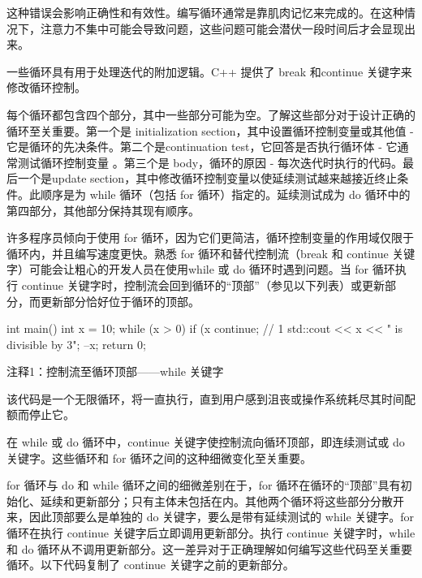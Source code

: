 这种错误会影响正确性和有效性。编写循环通常是靠肌肉记忆来完成的。在这种情况下，注意力不集中可能会导致问题，这些问题可能会潜伏一段时间后才会显现出来。


一些循环具有用于处理迭代的附加逻辑。C++ 提供了 break 和continue 关键字来修改循环控制。

每个循环都包含四个部分，其中一些部分可能为空。了解这些部分对于设计正确的循环至关重要。第一个是 initialization section，其中设置循环控制变量或其他值 - 它是循环的先决条件。第二个是continuation test，它回答是否执行循环体 - 它通常测试循环控制变量 。第三个是 body，循环的原因 - 每次迭代时执行的代码。最后一个是update section，其中修改循环控制变量以使延续测试越来越接近终止条件。此顺序是为 while 循环（包括 for 循环）指定的。延续测试成为 do 循环中的第四部分，其他部分保持其现有顺序。

许多程序员倾向于使用 for 循环，因为它们更简洁，循环控制变量的作用域仅限于循环内，并且编写速度更快。熟悉 for 循环和替代控制流（break 和 continue 关键字）可能会让粗心的开发人员在使用while 或 do 循环时遇到问题。当 for 循环执行 continue 关键字时，控制流会回到循环的“顶部”（参见以下列表）或更新部分，而更新部分恰好位于循环的顶部。


\begin{cpp}
int main() {
  int x = 10;
  while (x > 0) {
    if (x %
      continue; // 1
    std::cout << x << " is divisible by 3\n";
    --x;
  }
  return 0;
}
\end{cpp}

{\footnotesize
注释1：控制流至循环顶部——while 关键字
}

该代码是一个无限循环，将一直执行，直到用户感到沮丧或操作系统耗尽其时间配额而停止它。


在 while 或 do 循环中，continue 关键字使控制流向循环顶部，即连续测试或 do 关键字。这些循环和 for 循环之间的这种细微变化至关重要。


for 循环与 do 和 while 循环之间的细微差别在于，for 循环在循环的“顶部”具有初始化、延续和更新部分；只有主体未包括在内。其他两个循环将这些部分分散开来，因此顶部要么是单独的 do 关键字，要么是带有延续测试的 while 关键字。for 循环在执行 continue 关键字后立即调用更新部分。执行 continue 关键字时，while 和 do 循环从不调用更新部分。这一差异对于正确理解如何编写这些代码至关重要循环。以下代码复制了 continue 关键字之前的更新部分。

